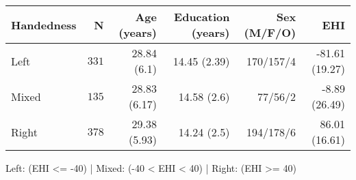 \setlength{\LTpost}{0mm}
\begin{longtable}{lrrrrr}
\toprule
Handedness & N & Age (years) & Education (years) & Sex (M/F/O) & EHI \\ 
\midrule
Left & $331$ & 28.84 (6.1) & 14.45 (2.39) & 170/157/4 & -81.61 (19.27) \\ 
Mixed & $135$ & 28.83 (6.17) & 14.58 (2.6) & 77/56/2 & -8.89 (26.49) \\ 
Right & $378$ & 29.38 (5.93) & 14.24 (2.5) & 194/178/6 & 86.01 (16.61) \\ 
\bottomrule
\end{longtable}
\begin{minipage}{\linewidth}
Left: (EHI <= -40)  |  Mixed: (-40 < EHI < 40)  |  Right: (EHI >= 40)\\
\end{minipage}

